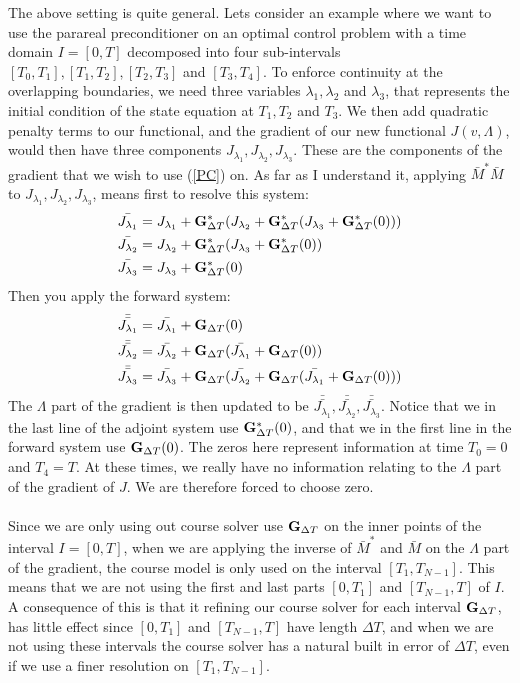 The above setting is quite general. Lets consider an example where we want to use the parareal preconditioner on an optimal control problem with a time domain $I=[0,T]$ decomposed into four sub-intervals $[T_0,T_1], [T_1,T_2], [T_2,T_3]$ and $[T_3,T_4]$. To enforce continuity at the overlapping boundaries, we need three variables $\lambda_1,\lambda_2$ and $\lambda_3$, that represents the initial condition of the state equation at $T_1,T_2$ and $T_3$. We then add quadratic penalty terms to our functional, and the gradient of our new functional $J(v,\Lambda)$, would then have three components $J_{\lambda_1}, J_{\lambda_2}, J_{\lambda_3}$. These are the components of the gradient that we wish to use (\ref{PC}) on. As far as I understand it, applying $\bar{M}^{*}\bar{M}$ to $J_{\lambda_1}, J_{\lambda_2}, J_{\lambda_3}$, means first to resolve this system:
\begin{align*}
\bar{J_{\lambda_1}} &=J_{\lambda_1} +\bold{G}_{\Delta T}^*(J_{\lambda_2} + \bold{G}_{\Delta T}^*(J_{\lambda_3} + \bold{G}_{\Delta T}^*(0)))\\
\bar{J_{\lambda_2}} &=J_{\lambda_2} + \bold{G}_{\Delta T}^*(J_{\lambda_3} + \bold{G}_{\Delta T}^*(0))\\
\bar{J_{\lambda_3}} &=J_{\lambda_3} + \bold{G}_{\Delta T}^*(0) \\
\end{align*} 
Then you apply the forward system:
\begin{align*}
\bar{\bar{J_{\lambda_1}}}&=\bar{J_{\lambda_1}} + \bold{G}_{\Delta T}(0) \\
\bar{\bar{J_{\lambda_2}}}&=\bar{J_{\lambda_2}}+ \bold{G}_{\Delta T}(\bar{J_{\lambda_1}} + \bold{G}_{\Delta T}(0)) \\
\bar{\bar{J_{\lambda_3}}}&=\bar{J_{\lambda_3}} + \bold{G}_{\Delta T}(\bar{J_{\lambda_2}}+ \bold{G}_{\Delta T}(\bar{J_{\lambda_1}} + \bold{G}_{\Delta T}(0)))
\end{align*} 
The $\Lambda$ part of the gradient is then updated to be $\bar{\bar{J_{\lambda_1}}}, \bar{\bar{J_{\lambda_2}}},\bar{\bar{J_{\lambda_3}}}$. Notice that we in the last line of the adjoint system use $\bold{G}_{\Delta T}^*(0)$, and that we in the first line in the forward system use $\bold{G}_{\Delta T}(0)$. The zeros here represent information at time $T_0=0$ and $T_4=T$. At these times, we really have no information relating to the $\Lambda$ part of the gradient of $J$. We are therefore forced to choose zero.
\\
\\
Since we are only using out course solver use $\bold{G}_{\Delta T}$ on the inner points of the interval $I=[0,T]$, when we are applying the inverse of $\bar{M}^{*}$ and $\bar{M}$ on the $\Lambda$ part of the gradient, the course model is only used on the interval $[T_1,T_{N-1}]$. This means that we are not using the first and last parts $[0,T_1]$ and $[T_{N-1},T]$ of $I$. A consequence of this is that it refining our course solver for each interval $\bold{G}_{\Delta T}$, has little effect since $[0,T_1]$ and $[T_{N-1},T]$ have length $\Delta T$, and when we are not using these intervals the course solver has a natural built in error of $\Delta T$, even if we use a finer resolution on $[T_1,T_{N-1}]$. 
